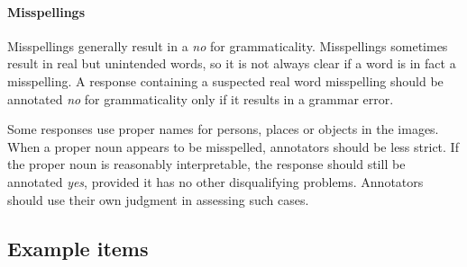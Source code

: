 \documentclass[12pt]{article}
\begin{document}
\paragraph{Misspellings} Misspellings generally result in a \textit{no} for grammaticality. Misspellings sometimes result in real but unintended words, so it is not always clear if a word is in fact a misspelling. A response containing a suspected real word misspelling should be annotated \textit{no} for grammaticality only if it results in a grammar error.

Some responses use proper names for persons, places or objects in the images. When a proper noun appears to be misspelled, annotators should be less strict. If the proper noun is reasonably interpretable, the response should still be annotated \textit{yes}, provided it has no other disqualifying problems. Annotators should use their own judgment in assessing such cases.

\clearpage

\subsection{Example items}
\end{document}
